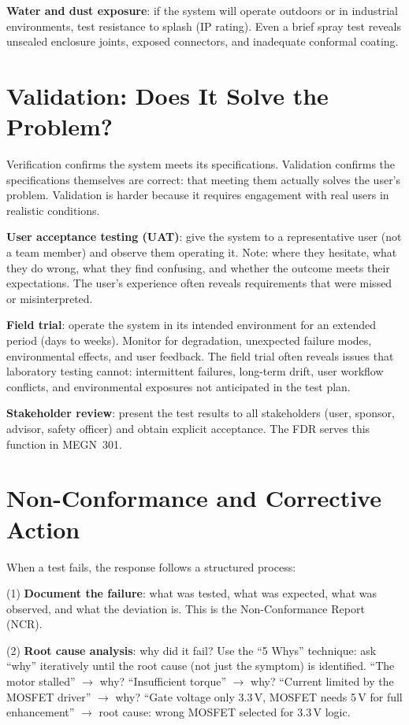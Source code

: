 \textbf{Water and dust exposure}: if the system will operate outdoors or in industrial environments, test resistance to splash (IP rating). Even a brief spray test reveals unsealed enclosure joints, exposed connectors, and inadequate conformal coating.

\section{Validation: Does It Solve the Problem?}
Verification confirms the system meets its specifications. Validation confirms the specifications themselves are correct: that meeting them actually solves the user's problem. Validation is harder because it requires engagement with real users in realistic conditions.

\textbf{User acceptance testing (UAT)}: give the system to a representative user (not a team member) and observe them operating it. Note: where they hesitate, what they do wrong, what they find confusing, and whether the outcome meets their expectations. The user's experience often reveals requirements that were missed or misinterpreted.

\textbf{Field trial}: operate the system in its intended environment for an extended period (days to weeks). Monitor for degradation, unexpected failure modes, environmental effects, and user feedback. The field trial often reveals issues that laboratory testing cannot: intermittent failures, long-term drift, user workflow conflicts, and environmental exposures not anticipated in the test plan.

\textbf{Stakeholder review}: present the test results to all stakeholders (user, sponsor, advisor, safety officer) and obtain explicit acceptance. The FDR serves this function in MEGN~301.

\section{Non-Conformance and Corrective Action}
When a test fails, the response follows a structured process:

(1) \textbf{Document the failure}: what was tested, what was expected, what was observed, and what the deviation is. This is the Non-Conformance Report (NCR).

(2) \textbf{Root cause analysis}: why did it fail? Use the ``5 Whys'' technique: ask ``why'' iteratively until the root cause (not just the symptom) is identified. ``The motor stalled'' $\to$ why? ``Insufficient torque'' $\to$ why? ``Current limited by the MOSFET driver'' $\to$ why? ``Gate voltage only 3.3\,V, MOSFET needs 5\,V for full enhancement'' $\to$ root cause: wrong MOSFET selected for 3.3\,V logic.

